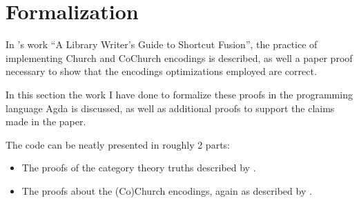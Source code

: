 \section{Formalization}\label{sec:formalization}
In \cite{Harper2011}'s work ``A Library Writer's Guide to Shortcut Fusion'', the practice of implementing Church and CoChurch encodings is described, as well a paper proof necessary to show that the encodings optimizations employed are correct.


In this section the work I have done to formalize these proofs in the programming language Agda is discussed, as well as additional proofs to support the claims made in the paper.

The code can be neatly presented in roughly 2 parts:
\begin{itemize}
  \item The proofs of the category theory truths described by \cite{Harper2011}.
  \item The proofs about the (Co)Church encodings, again as described by \cite{Harper2011}.
\end{itemize}




